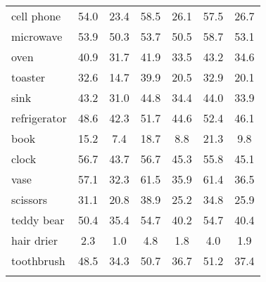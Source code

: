 \begin{table*}[h!]
{\begin{tabular}{@{}
L{1.7cm} 
!{\color{gray}\vrule} cc
!{\color{gray}\vrule} cc
!{\color{gray}\vrule} cc
@{}}
cell phone & 54.0 & 23.4 & 58.5 & 26.1 & 57.5 & 26.7 \\
microwave & 53.9 & 50.3 & 53.7 & 50.5 & 58.7 & 53.1 \\
oven & 40.9 & 31.7 & 41.9 & 33.5 & 43.2 & 34.6 \\
toaster & 32.6 & 14.7 & 39.9 & 20.5 & 32.9 & 20.1 \\
sink & 43.2 & 31.0 & 44.8 & 34.4 & 44.0 & 33.9 \\
refrigerator & 48.6 & 42.3 & 51.7 & 44.6 & 52.4 & 46.1 \\
book & 15.2 & 7.4 & 18.7 & 8.8 & 21.3 & 9.8 \\
clock & 56.7 & 43.7 & 56.7 & 45.3 & 55.8 & 45.1 \\
vase & 57.1 & 32.3 & 61.5 & 35.9 & 61.4 & 36.5 \\
scissors & 31.1 & 20.8 & 38.9 & 25.2 & 34.8 & 25.9 \\
teddy bear & 50.4 & 35.4 & 54.7 & 40.2 & 54.7 & 40.4 \\
hair drier & 2.3 & 1.0 & 4.8 & 1.8 & 4.0 & 1.9 \\
toothbrush & 48.5 & 34.3 & 50.7 & 36.7 & 51.2 & 37.4 \\
\Xhline{1pt}
\end{tabular}
}
\label{tab:per_category}
\end{table*}
